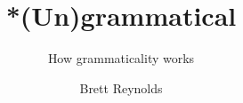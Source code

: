 \author{Brett Reynolds} %
\title{*(Un)grammatical}
\subtitle{How grammaticality works}
\renewcommand{\lsSeries}{} 
\newcommand{\lsSeriesTitle}{HPLS} 
\newcommand{\lsSeriesColor}{blue} 
\renewcommand{\lsSeriesNumber}{} 